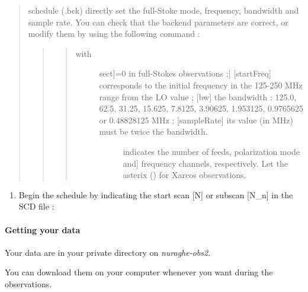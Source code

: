 \documentclass[letterpaper,10pt,english]{sphinxmanual}
\begin{document}
\begin{quote}

schedule (.bck) directly set the full-Stoke mode, frequency,
bandwidth and sample rate. You can check that the backend parameters
are correct, or modify them by using the following command :
\begin{quote}

\begin{quote}
\begin{description}
\item[{with}] \leavevmode{[}{[}sect{]}=0 in full-Stokes observations ;{]}
{[}startFreq{]} corresponds to the initial frequency in the
125-250 MHz range from the LO value ;
{[}bw{]} the bandwidth : 125.0, 62.5, 31.25, 15.625, 7.8125, 3.90625, 1.953125, 0.9765625 or 0.48828125 MHz ;
{[}sampleRate{]} its value (in MHz) must be twice the bandwidth.
\begin{description}
\item[{\code{*}}] \leavevmode{[}indicates the number of feeds, polarization mode and{]}
frequency channels,  respectively. Let the asterix (\code{*}) for Xarcos observations.

\end{description}

\end{description}
\end{quote}
\end{quote}
\end{quote}
\begin{enumerate}
\item {} 
Begin the schedule by indicating the start scan {[}N{]} or subscan {[}N\_n{]} in the SCD file :
\begin{quote}

\end{quote}

\end{enumerate}


\paragraph{Getting your data}
\label{SpectralLine/C-band/Xarcos/get-data:getting-your-data}\label{SpectralLine/C-band/Xarcos/get-data::doc}
Your data are in your private directory on \emph{nuraghe-obs2}.

You can download them on your computer whenever you want during the observations.
\begin{quote}

\end{quote}
\end{document}
